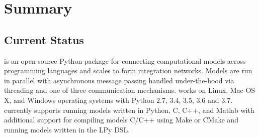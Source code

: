 \documentclass[journal]{IEEEtran}
\newcommand{\todo}[1]{{\color{red}{#1}}}
\newcommand{\pkg}{{\tt \todo{cis\_interface}}{}}
\begin{document}
\section{Summary}\label{S:discuss}

\subsection{Current Status}\label{SS:current}
%
{\pkg} is an open-source Python package for connecting computational models across programming languages and scales to form integration networks. Models are run in parallel with asynchronous message passing handled under-the-hood via threading and one of three communication mechanisms. {\pkg} works on Linux, Mac OS X, and Windows operating systems with Python 2.7, 3.4, 3.5, 3.6 and 3.7. {\pkg} currently supports running models written in Python, C, C++, and Matlab with additional support for compiling models C/C++ using Make \citep{Stallman2004} or CMake \citep{Martin2006} and running models written in the LPy \citep{Boudon2012} DSL.

\end{document}
